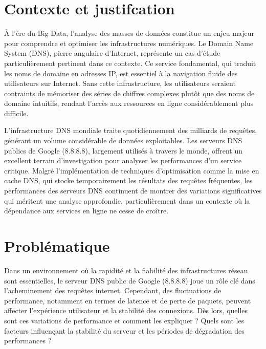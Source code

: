 \setcounter{page}{1}
\fancyhead[l]{}
\hspace{0.5cm}
\section*{Contexte et justifcation}
À l'ère du Big Data, l'analyse des masses de données constitue un enjeu majeur pour comprendre et optimiser les infrastructures numériques. Le Domain Name System (DNS), pierre angulaire d'Internet, représente un cas d'étude particulièrement pertinent dans ce contexte. Ce service fondamental, qui traduit les noms de domaine en adresses IP, est essentiel à la navigation fluide des utilisateurs sur Internet. Sans cette infrastructure, les utilisateurs seraient contraints de mémoriser des séries de chiffres complexes plutôt que des noms de domaine intuitifs, rendant l'accès aux ressources en ligne considérablement plus difficile.

\vspace{0.4cm}
L'infrastructure DNS mondiale traite quotidiennement des milliards de requêtes, générant un volume considérable de données exploitables. Les serveurs DNS publics de Google (8.8.8.8), largement utilisés à travers le monde, offrent un excellent terrain d'investigation pour analyser les performances d'un service critique. Malgré l'implémentation de techniques d'optimisation comme la mise en cache DNS, qui stocke temporairement les résultats des requêtes fréquentes, les performances des serveurs DNS continuent de montrer des variations significatives qui méritent une analyse approfondie, particulièrement dans un contexte où la dépendance aux services en ligne ne cesse de croître.


\vspace{0.4cm}
\section*{Problématique}
Dans un environnement où la rapidité et la fiabilité des infrastructures réseau sont essentielles, le serveur DNS public de Google (8.8.8.8) joue un rôle clé dans l’acheminement des requêtes internet. Cependant, des fluctuations de performance, notamment en termes de latence et de perte de paquets, peuvent affecter l’expérience utilisateur et la stabilité des connexions. Dès lors, quelles sont ces variations de performance et comment les expliquer ? Quels sont les facteurs influençant la stabilité du serveur et les périodes de dégradation des performances ?

